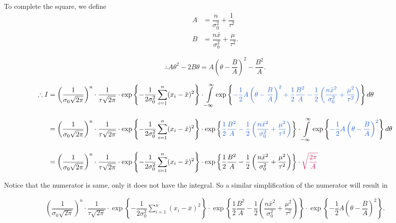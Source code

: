 \documentclass[12pt, a4paper]{article}
\begin{document}
To complete the square, we define
\begin{align*}
A &= \dfrac{n}{\sigma_0^2} + \dfrac{1}{\tau^2} \\[0.5em]
B &= \dfrac{n\bar{x}}{\sigma_0^2} + \dfrac{\mu}{\tau^2}.
\end{align*}

$$\therefore A\theta^2 - 2B\theta = A\left(\theta - \dfrac{B}{A}\right)^2 - \dfrac{B^2}{A}.$$

\newpage

\begin{align*}
\therefore I &=
\left(\dfrac{1}{\sigma_0\sqrt{2\pi}}\right)^n \cdot \dfrac{1}{\tau\sqrt{2\pi}} \cdot \exp\left\{ -\dfrac{1}{2\sigma_0^2}\sum\limits_{i=1}^{n}(x_i-\bar{x})^2 \right\} \cdot \int\limits_{-\infty}^{\infty} \exp\left\{ \textcolor[HTML]{205CD4}{-\dfrac{1}{2}A\left(\theta-\dfrac{B}{A}\right)^2 + \dfrac{1}{2}\dfrac{B^2}{A} - \dfrac{1}{2}\left(\dfrac{n\bar{x}^2}{\sigma_0^2} + \dfrac{\mu^2}{\tau^2}\right)} \right\} d\theta \\[1em]
&=
\left(\dfrac{1}{\sigma_0\sqrt{2\pi}}\right)^n \cdot \dfrac{1}{\tau\sqrt{2\pi}} \cdot \exp\left\{ -\dfrac{1}{2\sigma_0^2}\sum\limits_{i=1}^{n}(x_i-\bar{x})^2 \right\} \cdot \exp\left\{ \textcolor[HTML]{205CD4}{\dfrac{1}{2}\dfrac{B^2}{A} - \dfrac{1}{2}\left(\dfrac{n\bar{x}^2}{\sigma_0^2} + \dfrac{\mu^2}{\tau^2}\right)} \right\} \cdot \int\limits_{-\infty}^{\infty} \exp\left\{ \textcolor[HTML]{205CD4}{-\dfrac{1}{2}A\left(\theta-\dfrac{B}{A}\right)^2} \right\} d\theta \\[1em]
&=
\left(\dfrac{1}{\sigma_0\sqrt{2\pi}}\right)^n \cdot \dfrac{1}{\tau\sqrt{2\pi}} \cdot \exp\left\{ -\dfrac{1}{2\sigma_0^2}\sum\limits_{i=1}^{n}(x_i-\bar{x})^2 \right\} \cdot \exp\left\{ \dfrac{1}{2}\dfrac{B^2}{A} - \dfrac{1}{2}\left(\dfrac{n\bar{x}^2}{\sigma_0^2} + \dfrac{\mu^2}{\tau^2}\right) \right\} \cdot \textcolor[HTML]{C71056}{\sqrt{\dfrac{2\pi}{A}}}
\end{align*}

Notice that the numerator is same, only it does not have the integral. So a similar simplification of the numerator will result in

\begin{align*}
\left(\dfrac{1}{\sigma_0\sqrt{2\pi}}\right)^n \cdot \dfrac{1}{\tau\sqrt{2\pi}} \cdot \exp\left\{ -\dfrac{1}{2\sigma_0^2}\sum\limits_{i=1}^{n}(x_i-\bar{x})^2 \right\} \cdot \exp\left\{ \dfrac{1}{2}\dfrac{B^2}{A} - \dfrac{1}{2}\left(\dfrac{n\bar{x}^2}{\sigma_0^2} + \dfrac{\mu^2}{\tau^2}\right) \right\} \cdot \exp\left\{ -\dfrac{1}{2}A\left(\theta-\dfrac{B}{A}\right)^2 \right\}.
\end{align*}
\end{document}
